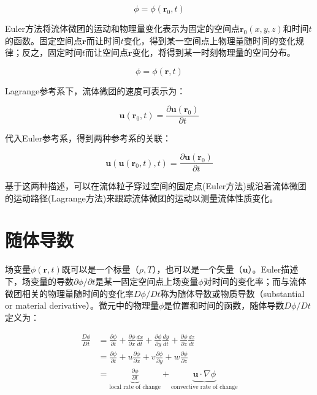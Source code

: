 \begin{equation}
\phi = \phi(\bm{r}_0, t)
\end{equation}

Euler方法将流体微团的运动和物理量变化表示为固定的空间点$ \bm{r}_0(x, y, z) $和时间$ t $的函数。固定空间点$ \bm{r} $而让时间$ t $变化，得到某一空间点上物理量随时间的变化规律；反之，固定时间$ t $而让空间点$ \bm{r} $变化，将得到某一时刻物理量的空间分布。

\begin{equation}
\phi = \phi(\bm{r}, t)
\end{equation}

Lagrange参考系下，流体微团的速度可表示为：

\[ \bm{u}(\bm{r}_0, t) = \frac{\partial \bm{u}(\bm{r}_0)}{\partial t} \]

代入Euler参考系，得到两种参考系的关联：

\begin{equation}
\bm{u}(\bm{u}(\bm{r}_0, t), t) = \frac{\partial \bm{u}(\bm{r}_0)}{\partial t}
\end{equation}

基于这两种描述，可以在流体粒子穿过空间的固定点(Euler方法)或沿着流体微团的运动路径(Lagrange方法)来跟踪流体微团的运动以测量流体性质变化。

\section{随体导数}

场变量$ \phi(\bm{r}, t) $既可以是一个标量（$ \rho, T $），也可以是一个矢量（$ \bm{u} $）。Euler描述下，场变量的导数$ \partial\phi/\partial t $是某一固定空间点上场变量$ \phi $对时间的变化率；而与流体微团相关的物理量随时间的变化率$ D\phi/Dt $称为随体导数或物质导数（substantial or material derivative）。微元中的物理量$ \phi $是位置和时间的函数，随体导数$ D\phi/Dt $定义为：

\begin{align}
\frac{D\phi}{Dt} & = \frac{\partial \phi}{\partial t}+\frac{\partial \phi}{\partial x}\frac{dx}{dt} + \frac{\partial \phi}{\partial y}\frac{dy}{dt} + \frac{\partial \phi}{\partial z}\frac{dz}{dt} \\
& =\frac{\partial \phi}{\partial t}+u\frac{\partial \phi}{\partial x}+v\frac{\partial \phi}{\partial y}+w\frac{\partial \phi}{\partial z} \\
& = \underbrace{\frac{\partial \phi}{\partial t}}_{\text{local rate
    of change}}+\underbrace{\bm{u}\cdot \nabla \phi}_{\text{convective rate
    of change}}
\end{align}

